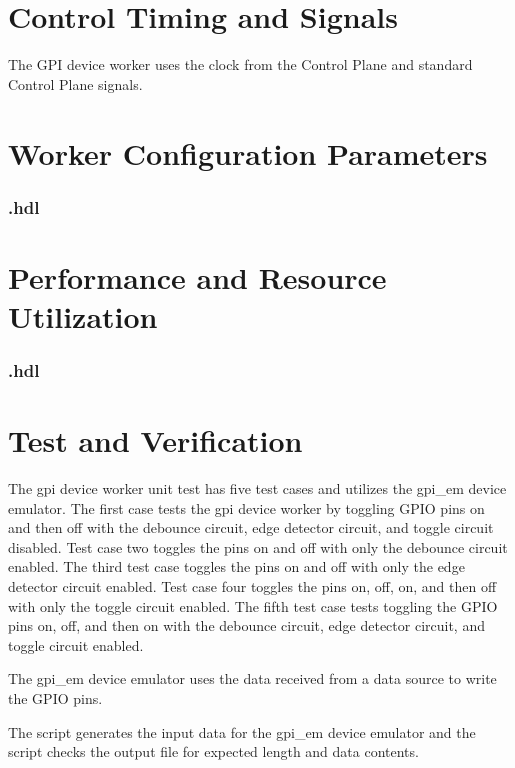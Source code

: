 \section*{Control Timing and Signals}
\begin{flushleft}

The GPI device worker uses the clock from the Control Plane and standard Control Plane signals.

\end{flushleft}

\begin{landscape}
\section*{Worker Configuration Parameters}
\subsubsection*{\comp.hdl}

\section*{Performance and Resource Utilization}
\subsubsection*{\comp.hdl}

\end{landscape}



\section*{Test and Verification}
\normalsize

\begin{flushleft}

The gpi device worker unit test has five test cases and utilizes the gpi\_em device emulator. The first case tests the gpi device worker by toggling GPIO pins on and then off with the debounce circuit, edge detector circuit, and toggle circuit disabled. Test case two toggles the pins on and off with only the debounce circuit enabled. The third test case toggles the pins on and off with only the edge detector circuit enabled. Test case four toggles the pins on, off, on, and then off with only the toggle circuit enabled. The fifth test case tests toggling the GPIO pins on, off, and then on with the debounce circuit, edge detector circuit, and toggle circuit enabled. \newline

The gpi\_em device emulator uses the data received from a data source to write the GPIO pins. \newline

The  script generates the input data for the gpi\_em device emulator and the  script checks the output file for expected length and
data contents.

\end{flushleft}

